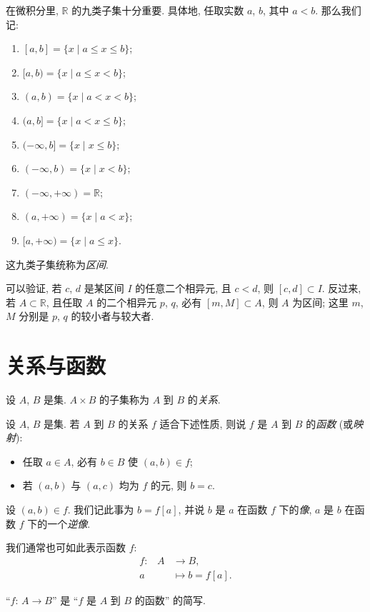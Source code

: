 \begin{definition}
    在微积分里, $\mathbb{R}$ 的九类子集十分重要. 具体地, 任取实数 $a$, $b$, 其中 $a < b$. 那么我们记:
    \begin{enumerate}
        \item $[a, b] = \{ x \mid a \leq x \leq b \}$;
        \item $[a, b) = \{ x \mid a \leq x < b \}$;
        \item $(a, b) = \{ x \mid a < x < b \}$;
        \item $(a, b] = \{ x \mid a < x \leq b \}$;
        \item $(-\infty, b] = \{ x \mid x \leq b \}$;
        \item $(-\infty, b) = \{ x \mid x < b \}$;
        \item $(-\infty, +\infty) = \mathbb{R}$;
        \item $(a, +\infty) = \{ x \mid a < x \}$;
        \item $[a, +\infty) = \{ x \mid a \leq x \}$.
    \end{enumerate}
    这九类子集统称为\emph{区间}.
\end{definition}

\begin{remark}
    可以验证, 若 $c$, $d$ 是某区间 $I$ 的任意二个相异元, 且 $c < d$, 则 $[c, d] \subset I$. 反过来, 若 $A \subset \mathbb{R}$, 且任取 $A$ 的二个相异元 $p$, $q$, 必有 $[m, M] \subset A$, 则 $A$ 为区间; 这里 $m$, $M$ 分别是 $p$, $q$ 的较小者与较大者.
\end{remark}

\section{关系与函数}

\begin{definition}
    设 $A$, $B$ 是集. $A \times B$ 的子集称为 $A$ 到 $B$ 的\emph{关系}.
\end{definition}

\begin{definition}
    设 $A$, $B$ 是集. 若 $A$ 到 $B$ 的关系 $f$ 适合下述性质, 则说 $f$ 是 $A$ 到 $B$ 的\emph{函数} (或\emph{映射}):
    \begin{itemize}
        \item 任取 $a \in A$, 必有 $b \in B$ 使 $(a,b) \in f$;
        \item 若 $(a,b)$ 与 $(a,c)$ 均为 $f$ 的元, 则 $b = c$.
    \end{itemize}
    设 $(a,b) \in f$. 我们记此事为 $b = f[a]$, 并说 $b$ 是 $a$ 在函数 $f$ 下的\emph{像}, $a$ 是 $b$ 在函数 $f$ 下的一个\emph{逆像}.

    我们通常也可如此表示函数 $f$:
    \begin{align*}
        \text{$f$:} \quad
        A & \to B,            \\
        a & \mapsto b = f[a].
    \end{align*}

    ``$f$: $A \to B$'' 是 ``$f$ 是 $A$ 到 $B$ 的函数'' 的简写.
\end{definition}

